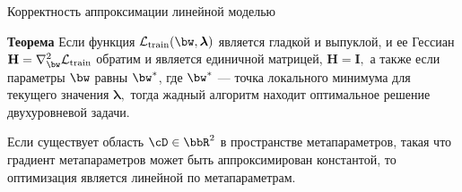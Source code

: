 \documentclass[12pt, aspectratio=169]{beamer}
\begin{document}


\begin{frame}{Корректность аппроксимации линейной моделью}

\textbf{Теорема} Если функция $\mathcal{L}_{\textnormal{train}}(\bw, \boldsymbol{\lambda})$ является гладкой и выпуклой, и ее Гессиан $\mathbf{H} = \nabla_{\bw}^2 \mathcal{L}_\textnormal{train}$ обратим и является единичной матрицей, $\mathbf{H} = \mathbf{I},$ а также если параметры $\bw$ равны $\bw^*$, где $\bw^*$ --- точка локального минимума для текущего значения $\boldsymbol{\lambda},$ тогда жадный алгоритм находит оптимальное решение двухуровневой задачи.\\

\vspace{0.2cm}

Если существует область $\cD \in \bbR^2$ в пространстве метапараметров, такая что градиент метапараметров может быть аппроксимирован константой, то оптимизация является линейной по метапараметрам.

\end{frame}




\end{document}
